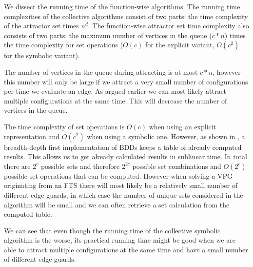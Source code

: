 We dissect the running time of the function-wise algorithms. The running time complexities of the collective algorithms consist of two parts: the time complexity of the attractor set times $n^d$. The function-wise attractor set time complexity also consists of two parts: the maximum number of vertices in the queue ($c*n$) times the time complexity for set operations ($O(c)$ for the explicit variant, $O(c^2)$ for the symbolic variant).

The number of vertices in the queue during attracting is at most $c*n$, however this number will only be large if we attract a very small number of configurations per time we evaluate an edge. As argued earlier we can most likely attract multiple configurations at the same time. This will decrease the number of vertices in the queue.

The time complexity of set operations is $O(c)$ when using an explicit representation and $O(c^2)$ when using a symbolic one. However, as shown in \cite{BDD_running_time}, a breadth-depth first implementation of BDDs keeps a table of already computed results. This allows us to get already calculated results in sublinear time. In total there are $2^c$ possible sets and therefore $2^{2c}$ possible set combinations and $O(2^c)$ possible set operations that can be computed. However when solving a VPG originating from an FTS there will most likely be a relatively small number of different edge guards, in which case the number of unique sets considered in the algorithm will be small and we can often retrieve a set calculation from the computed table.

We can see that even though the running time of the collective symbolic algorithm is the worse, its practical running time might be good when we are able to attract multiple configurations at the same time and have a small number of different edge guards.